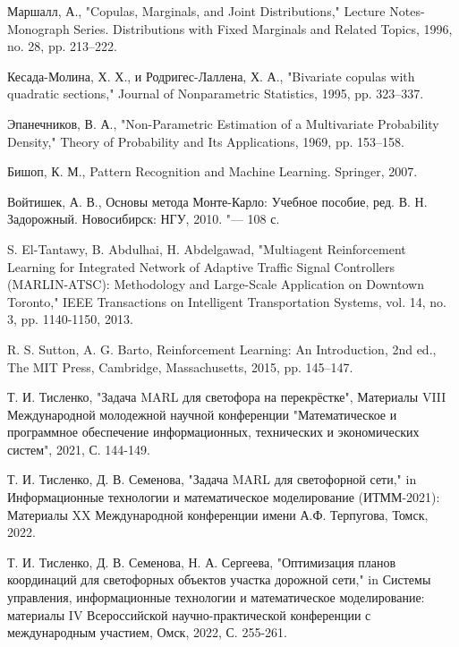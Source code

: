 \documentclass[11pt]{ubs}
\begin{document}
\begin{thebibliography}{10}
   Маршалл, А., "Copulas, Marginals, and Joint Distributions," {Lecture Notes-Monograph Series. Distributions with Fixed Marginals and Related Topics}, 1996, no. 28, pp. 213–222.

   Кесада-Молина, Х. Х., и Родригес-Лаллена, Х. А., "Bivariate copulas with quadratic sections," {Journal of Nonparametric Statistics}, 1995, pp. 323–337.

   Эпанечников, В. А., "Non-Parametric Estimation of a Multivariate Probability Density," {Theory of Probability and Its Applications}, 1969, pp. 153–158.

   Бишоп, К. М., {Pattern Recognition and Machine Learning}. Springer, 2007.

   Войтишек, А. В., {Основы метода Монте-Карло: Учебное пособие}, ред. В. Н. Задорожный. Новосибирск: НГУ, 2010. "--- 108 с.




   S. El-Tantawy, B. Abdulhai, H. Abdelgawad, "Multiagent Reinforcement Learning for Integrated Network of Adaptive Traffic Signal Controllers (MARLIN-ATSC): Methodology and Large-Scale Application on Downtown Toronto," {IEEE Transactions on Intelligent Transportation Systems}, vol. 14, no. 3, pp. 1140-1150, 2013.


   R. S. Sutton, A. G. Barto, {Reinforcement Learning: An Introduction}, 2nd ed., The MIT Press, Cambridge, Massachusetts, 2015, pp. 145–147.

   Т. И. Тисленко, "Задача MARL для светофора на перекрёстке",  Материалы VIII Международной молодежной научной конференции "Математическое и программное обеспечение информационных, технических и экономических систем", 2021, С. 144-149.

   Т. И. Тисленко, Д. В. Семенова, "Задача MARL для светофорной сети," in {Информационные технологии и математическое моделирование (ИТММ-2021): Материалы XX Международной конференции имени А.Ф. Терпугова}, Томск, 2022.

   Т. И. Тисленко, Д. В. Семенова, Н. А. Сергеева, "Оптимизация планов координаций для светофорных объектов участка дорожной сети," in {Системы управления, информационные технологии и математическое моделирование: материалы IV Всероссийской научно-практической конференции с международным участием}, Омск, 2022, С. 255-261.




\end{thebibliography}

\newpage
\makeenginfo
\makeauxinfo
\end{document}
